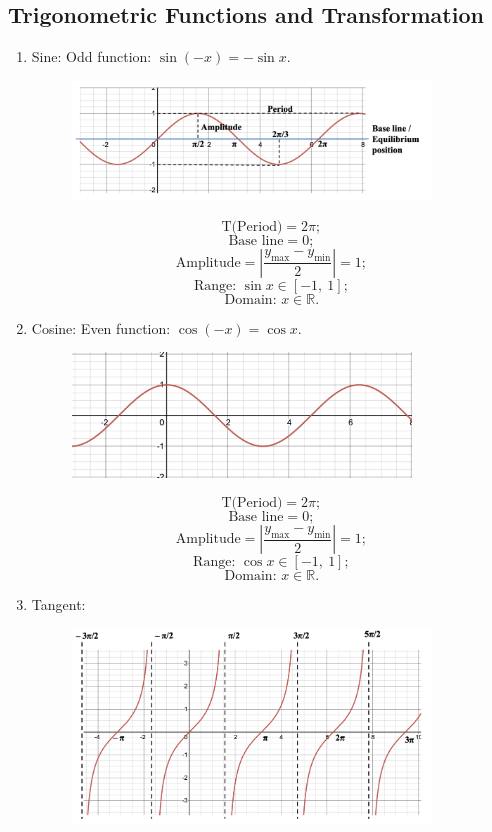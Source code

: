 \documentclass[12pt, a4paper]{article}
\def\R{{\mathbb{R}}}
\begin{document}
\subsection{Trigonometric Functions and Transformation}
\begin{enumerate}
  \item Sine: Odd function: $\sin{(-x)}=-\sin{x}$.
  \begin{figure}[H]
    \centering
    \includegraphics[width=0.9\textwidth]{Fig.25.jpg}
  \end{figure}
  $$\text{T(Period)}=2\pi;$$
  $$\text{Base line}=0;$$
  $$\text{Amplitude}=\left|\frac{y_{\text{max}}-y_{\text{min}}}{2}\right|=1;$$
  $$\text{Range: }\sin{x}\in\left[-1,\ 1\right];$$
  $$\text{Domain: }x\in\R.$$
  \item Cosine: Even function: $\cos{(-x)}=\cos{x}$.
  \begin{figure}[H]
    \centering
    \includegraphics[width=0.85\textwidth]{Fig.26.jpg}
  \end{figure}
  $$\text{T(Period)}=2\pi;$$
  $$\text{Base line}=0;$$
  $$\text{Amplitude}=\left|\frac{y_{\text{max}}-y_{\text{min}}}{2}\right|=1;$$
  $$\text{Range: }\cos{x}\in\left[-1,\ 1\right];$$
  $$\text{Domain: }x\in\R.$$
  \item Tangent: 
  \begin{figure}[H]
    \centering
    \includegraphics[width=0.9\textwidth]{Fig.27.jpg}

\end{figure}
\end{enumerate}
\end{document}
